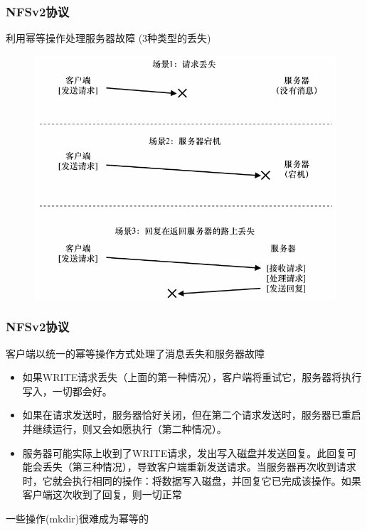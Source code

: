 \begin{frame}[fragile]
    \frametitle{NFSv2协议}
    利用幂等操作处理服务器故障 (3种类型的丢失)
    \begin{figure}
        \includegraphics[width=0.5\linewidth]{figs/nfsv2-lose.png}
    \end{figure}
    
\end{frame}

\begin{frame}[fragile]
    \frametitle{NFSv2协议}
    客户端以统一的幂等操作方式处理了消息丢失和服务器故障
    
    \begin{itemize}
        \item 如果WRITE请求丢失（上面的第一种情况），客户端将重试它，服务器将执行写入，一切都会好。 
        \item 如果在请求发送时，服务器恰好关闭，但在第二个请求发送时，服务器已重启并继续运行，则又会如愿执行（第二种情况）。
        \item 服务器可能实际上收到了WRITE请求，发出写入磁盘并发送回复。此回复可能会丢失（第三种情况），导致客户端重新发送请求。当服务器再次收到请求时，它就会执行相同的操作：将数据写入磁盘，并回复它已完成该操作。如果客户端这次收到了回复，则一切正常
    \end{itemize}
    一些操作(mkdir)很难成为幂等的
    
\end{frame}


